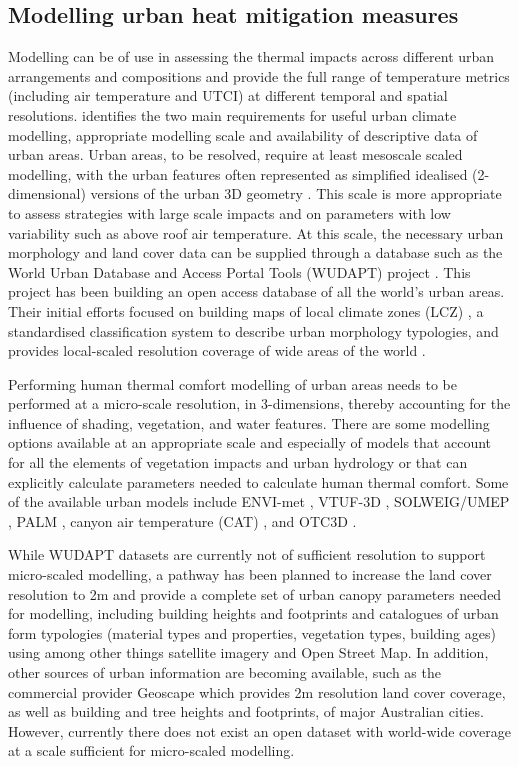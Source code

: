 \documentclass[final,3p,times,authoryear]{elsarticle}
\begin{document}
\subsection{Modelling urban heat mitigation measures}

Modelling can be of use in assessing the thermal impacts across different urban arrangements and compositions and provide the full range of temperature metrics (including air temperature and UTCI) at different temporal and spatial resolutions. \cite{Masson2020} identifies the two main requirements for useful urban climate modelling, appropriate modelling scale and availability of descriptive data of urban areas. Urban areas, to be resolved, require at least mesoscale scaled modelling, with the urban features often represented as simplified idealised (2-dimensional) versions of the urban 3D geometry \citep{Masson2005}. This scale is more appropriate to assess strategies with large scale impacts and on parameters with low variability such as above roof air temperature. At this scale, the necessary urban morphology and land cover data can be supplied through a database such as the World Urban Database and Access Portal Tools (WUDAPT) project \citep{Ching2018a}. This project has been building an open access database of all the world's urban areas. Their initial efforts focused on building maps of local climate zones (LCZ) \citep{Stewart2012b}, a standardised classification system to describe urban morphology typologies, and provides local-scaled resolution coverage of wide areas of the world \citep{Demuzere2019}.


Performing human thermal comfort modelling of urban areas needs to be performed at a micro-scale resolution, in 3-dimensions, thereby accounting for the influence of shading, vegetation, and water features. There are some modelling options available at an appropriate scale and especially of models that account for all the elements of vegetation impacts and urban hydrology or that can explicitly calculate parameters needed to calculate human thermal comfort. Some of the available urban models include ENVI-met \citep{Bruse1999}, VTUF-3D \citep{Nice2018a}, SOLWEIG/UMEP \citep{Lindberg2018}, PALM \citep{Dominik2019}, canyon air temperature (CAT) \citep{Erell2006}, and OTC3D \citep{Nazarian2018}. 

While WUDAPT datasets are currently not of sufficient resolution to support micro-scaled modelling, a pathway has been planned \citep{Ching2019} to increase the land cover resolution to 2m and provide a complete set of urban canopy parameters needed for modelling, including building heights and footprints and catalogues of urban form typologies (material types and properties, vegetation types, building ages) using among other things satellite imagery and Open Street Map. In addition, other sources of urban information are becoming available, such as the commercial provider Geoscape \citep{Geoscape2020} which provides 2m resolution land cover coverage, as well as building and tree heights and footprints, of major Australian cities. However, currently there does not exist an open dataset with world-wide coverage at a scale sufficient for micro-scaled modelling. 
\end{document}
